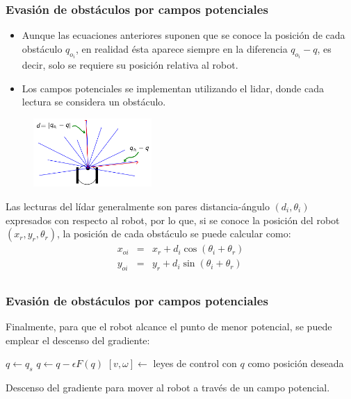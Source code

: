 \begin{frame}\frametitle{Evasión de obstáculos por campos potenciales}
  \begin{itemize}
  \item Aunque las ecuaciones anteriores suponen que se conoce la posición de cada obstáculo $q_{o_i}$, en realidad ésta aparece siempre en la diferencia $q_{o_i} - q$, es decir, solo se requiere su posición relativa al robot.
  \item Los campos potenciales se implementan utilizando el lidar, donde cada lectura se considera un obstáculo. 
  \end{itemize}
  \begin{figure}
    \centering
    \includegraphics[width=0.4\textwidth]{Figures/PotFieldsLidar.png}
  \end{figure}
  Las lecturas del lídar generalmente son pares distancia-ángulo $(d_i,\theta_i)$ expresados con respecto al robot, por lo que, si se conoce la posición del robot $(x_r,y_r,\theta_r)$, la posición de cada obstáculo se puede calcular como:
  \begin{eqnarray*}
    x_{oi} &=& x_r + d_i\cos(\theta_i + \theta_r)\\
    y_{oi} &=& y_r + d_i\sin(\theta_i + \theta_r)\\
  \end{eqnarray*}
\end{frame}

\begin{frame}\frametitle{Evasión de obstáculos por campos potenciales}
  Finalmente, para que el robot alcance el punto de menor potencial, se puede emplear el descenso del gradiente:
  \[\]
  \begin{algorithm}[H]
  \DontPrintSemicolon
  \;
$q \leftarrow q_s$\;
{
  $q \leftarrow q - \epsilon F(q)$\;
  $[v,\omega] \leftarrow $ leyes de control con $q$ como posición deseada\;
}
  \caption{Descenso del gradiente para mover al robot a través de un campo potencial.}
  \label{alg:PotFields}
\end{algorithm}
\end{frame}

